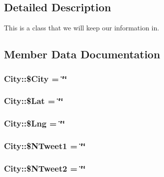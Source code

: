 \subsection{Detailed Description}
This is a class that we will keep our information in. 

\subsection{Member Data Documentation}
\subsubsection[{\texorpdfstring{\$\+City}{$City}}]{\setlength{\rightskip}{0pt plus 5cm}City\+::\$\+City = \char`\"{}\char`\"{}}\hypertarget{classCity_a37b890581b830d6dcb43dee2d8c98463}{}\label{classCity_a37b890581b830d6dcb43dee2d8c98463}
\subsubsection[{\texorpdfstring{\$\+Lat}{$Lat}}]{\setlength{\rightskip}{0pt plus 5cm}City\+::\$\+Lat = \char`\"{}\char`\"{}}\hypertarget{classCity_af2b3e408999c8ab317e80a107c543dc4}{}\label{classCity_af2b3e408999c8ab317e80a107c543dc4}
\subsubsection[{\texorpdfstring{\$\+Lng}{$Lng}}]{\setlength{\rightskip}{0pt plus 5cm}City\+::\$\+Lng = \char`\"{}\char`\"{}}\hypertarget{classCity_a8df2449cae23d59eff5e5fa2747155e6}{}\label{classCity_a8df2449cae23d59eff5e5fa2747155e6}
\subsubsection[{\texorpdfstring{\$\+N\+Tweet1}{$NTweet1}}]{\setlength{\rightskip}{0pt plus 5cm}City\+::\$\+N\+Tweet1 = \char`\"{}\char`\"{}}\hypertarget{classCity_af0ef76f4a336e0e471971cfdcc9a4da6}{}\label{classCity_af0ef76f4a336e0e471971cfdcc9a4da6}
\subsubsection[{\texorpdfstring{\$\+N\+Tweet2}{$NTweet2}}]{\setlength{\rightskip}{0pt plus 5cm}City\+::\$\+N\+Tweet2 = \char`\"{}\char`\"{}}\hypertarget{classCity_a91717a27f9d2f1c3243fe1388a1013f4}{}\label{classCity_a91717a27f9d2f1c3243fe1388a1013f4}
